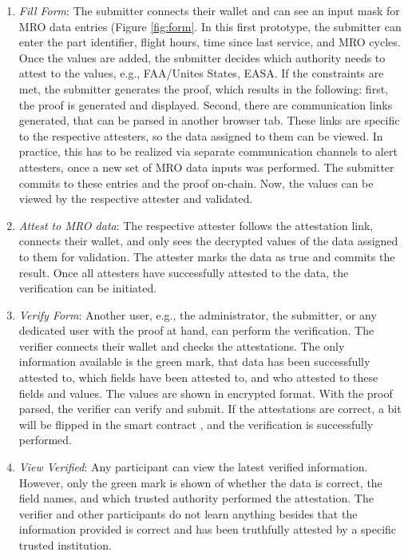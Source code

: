 \begin{enumerate}
\item \textit{Fill Form}:
The submitter connects their wallet and can see an input mask for MRO data entries (Figure \ref{fig:form}. In this first prototype, the submitter can enter the part identifier, flight hours, time since last service, and MRO cycles. Once the values are added, the submitter decides which authority needs to attest to the values, e.g., FAA/Unites States, EASA. If the constraints are met, the submitter generates the proof, which results in the following: first, the proof is generated and displayed. Second, there are communication links generated, that can be parsed in another browser tab. These links are specific to the respective attesters, so the data assigned to them can be viewed. In practice, this has to be realized via separate communication channels to alert attesters, once a new set of MRO data inputs was performed. The submitter commits to these entries and the proof on-chain. Now, the values can be viewed by the respective attester and validated.

\item \textit{Attest to MRO data}: The respective attester follows the attestation link, connects their wallet, and only sees the decrypted values of the data assigned to them for validation. The attester marks the data as true and commits the result. Once all attesters have successfully attested to the data, the verification can be initiated.

\item \textit{Verify Form}: Another user, e.g., the administrator, the submitter, or any dedicated user with the proof at hand, can perform the verification. The verifier connects their wallet and checks the attestations. The only information available is the green mark, that data has been successfully attested to, which fields have been attested to, and who attested to these fields and values. The values are shown in encrypted format. With the proof parsed, the verifier can verify and submit. If the attestations are correct, a bit will be flipped in the smart contract \citep{zkdocs}, and the verification is successfully performed.

\item \textit{View Verified}: Any participant can view the latest verified information. However, only the green mark is shown of whether the data is correct, the field names, and which trusted authority performed the attestation. The verifier and other participants do not learn anything besides that the information provided is correct and has been truthfully attested by a specific trusted institution.
\end{enumerate}

